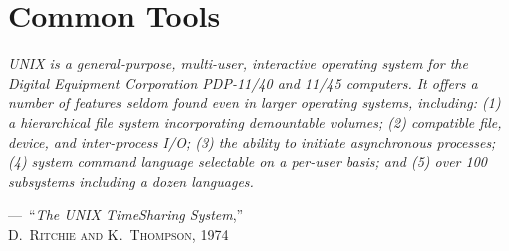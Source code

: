 \documentclass[10pt,openany,twoside,letterpaper,extrafontsizes]{memoir}
\newif\ifscaleforSixNine
\newcommand{\epioffset}{0mm}
\newcommand{\sixnineEpi}[3]{
\ifscaleforSixNine
\renewcommand{\blueboxheight}{#1}
\setlength{\epigraphwidth}{#2\textwidth}
\renewcommand{\epioffset}{#3}
\fi
}
\newcommand\myepigraph[3]{%
\vspace{#3}%
\epigraph{\textit{#1}}{#2}%
}
\newcommand{\blueboxheight}{10}
\begin{document}
\renewcommand{\blueboxheight}{16}
\setlength{\epigraphwidth}{0.48\textwidth}
\renewcommand{\epioffset}{-55mm}
\sixnineEpi{16}{0.48}{-54mm}
\chapter{Common Tools}
\label{chap-tools}
\myepigraph{%
UNIX is a general-purpose, multi-user, interactive
operating system for the Digital Equipment Corporation
PDP-11/40 and 11/45 computers. It offers a number
of features seldom found even in larger operating systems,
including: (1) a hierarchical file system incorporating
demountable volumes; (2) compatible file, device,
and inter-process I/O; (3) the ability to initiate asynchronous
processes; (4) system command language selectable
on a per-user basis; and (5) over 100 subsystems
including a dozen languages.
}
{---~``\textit{The UNIX TimeSharing System},''\\ \textsc{D.~Ritchie and K.~Thompson}, 1974}{\epioffset}
\end{document}

